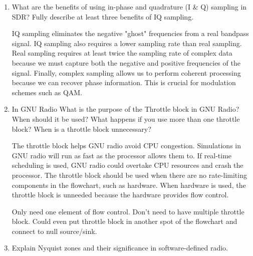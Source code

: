\documentclass{article}
\begin{document}
\begin{enumerate}
	\item What are the benefits of using in-phase and quadrature (I \& Q) sampling in SDR? Fully describe at least three benefits of IQ sampling.
	
	IQ sampling eliminates the negative "ghost" frequencies from a real bandpass signal. IQ sampling also requires a lower sampling rate than real sampling. Real sampling requires at least twice the sampling rate of complex data because we must capture both the negative and positive frequencies of the signal. Finally, complex sampling allows us to perform coherent processing because we can recover phase information. This is crucial for modulation schemes such as QAM.
	
	\item In GNU Radio What is the purpose of the Throttle block in GNU Radio? When should it be used? What happens if you use more than one throttle block? When is a throttle block unnecessary?

		The throttle block helps GNU radio avoid CPU congestion. Simulations in GNU radio will run as fast as the processor allows them to. If real-time scheduling is used, GNU radio could overtake CPU resources and crash the processor. The throttle block should be used when there are no rate-limiting components in the flowchart, such as hardware. When hardware is used, the throttle block is unneeded because the hardware provides flow control.
		
		Only need one element of flow control. Don't need to have multiple throttle block. Could even put throttle block in another spot of the flowchart and connect to null source/sink.
		
	\item  Explain Nyquist zones and their significance in software-defined radio.
	

\end{enumerate}
\end{document}
